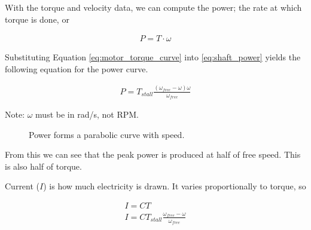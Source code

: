 \documentclass[10pt,letterpaper]{book}
\begin{document}
With the torque and velocity data, we can compute the power; the rate at which torque is done, or

\begin{align} \label{eq:shaft_power}
  P = T \cdot \omega
\end{align}

Substituting Equation \ref{eq:motor_torque_curve} into \ref{eq:shaft_power} yields the following equation for the power curve.

\begin{align} \label{eq:motor_power_curve}
  P = T_{stall} \frac{(\omega_{free}-\omega) \omega}{\omega_{free}}
\end{align}

Note: $\omega$ must be in rad/s, not RPM.

\begin{figure}[H] \centering \label{fig:motor_torque_curve}
\caption{Power forms a parabolic curve with speed.}
\end{figure}

From this we can see that the peak power is produced at half of free speed. This is also half of torque.

Current ($I$) is how much electricity is drawn. It varies proportionally to torque, so

\begin{align} \label{eq:motor_current_curve}
  I = C T \nonumber \\
  I = C T_{stall} \frac{\omega_{free}-\omega}{\omega_{free}}
\end{align}
\end{document}
